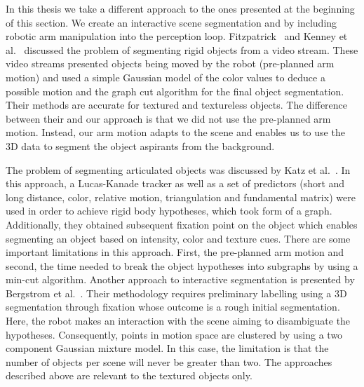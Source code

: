 In this thesis we take a different approach to the ones presented at the beginning of this section. We create an interactive scene segmentation and by including robotic arm manipulation into the perception loop. Fitzpatrick~\cite{fitzpatrick_active_vision} and Kenney et al.~\cite{KenneyInteractive} discussed the problem of segmenting rigid objects from a video stream. These video streams presented objects being moved by the robot (pre-planned arm motion) and used a simple Gaussian model of the color values to deduce a possible motion and the graph cut algorithm for the final object segmentation. Their methods are accurate for textured and textureless objects. The difference between their and our approach is that we did not use the pre-planned arm motion. Instead, our arm motion adapts to the scene and enables us to use the 3D data to segment the object aspirants from the background.

The problem of segmenting articulated objects was discussed by Katz et al.~\cite{Katz-WS-MM-ICRA2011}. In this approach, a Lucas-Kanade tracker as well as a set of predictors (short and long distance, color, relative motion, triangulation and fundamental matrix) were used in order to achieve rigid body hypotheses, which took form of a graph. Additionally, they obtained subsequent fixation point on the object which enables segmenting an object based on intensity, color and texture cues. There are some important limitations in this approach. First, the pre-planned arm motion and second, the time needed to break the object hypotheses into subgraphs by using a min-cut algorithm. 
Another approach to interactive segmentation is presented by Bergstrom et al.~\cite{bergstrom11icvs}. Their methodology requires preliminary labelling using a 3D segmentation through fixation whose outcome is a rough initial segmentation. Here, the robot makes an interaction with the scene aiming to disambiguate the hypotheses. Consequently, points in motion space are clustered by using a two component Gaussian mixture model. In this case, the limitation is that the number of objects per scene will never be greater than two.
The approaches described above are relevant to the textured objects only. 

